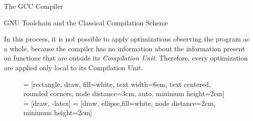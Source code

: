 \begin{section}{The GCC Compiler}
\begin{subsection}{GNU Toolchain and the Classical Compilation Scheme}

In this process, it is not possible to apply optimizations observing the program
as a whole, because the compiler has no information about the information present
on functions that are outside its \textit{Compilation Unit}. Therefore, every
optimization are applied only local to its Compilation Unit.


\begin{figure}
 = [rectangle, draw, fill=white,
    text width=6em, text centered, rounded corners, node distance=3cm, auto, minimum height=2em]
 = [draw, -latex]
 = [draw, ellipse,fill=white, node distance=2cm,
    minimum height=2em]
\begin{center}
\end{center}
\end{figure}
\end{subsection}
\end{section}
